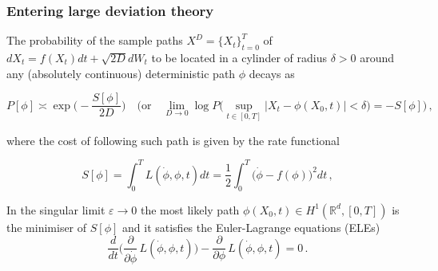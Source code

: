 \documentclass[./main.tex]{subfiles}
\begin{document}
\begin{frame}[t, label=slide06]
        \frametitle{Entering large deviation theory}

        \footnotesize
        
        \begin{theorem}\label{thm:freidlin_wentzell}
                The probability of the sample paths $X^{D}=\{X_{t}\}_{t=0}^{T}$ of $dX_{t} = f(X_{t})dt + \sqrt{2D}dW_{t}$ to be located in a cylinder of radius $\delta>0$ around any (absolutely continuous) deterministic path $\phi$ decays as

                \vspace{-0.4cm}
                \begin{equation*}
                        P[\phi]\asymp \exp\bigg(-\frac{S[\phi]}{2D}\bigg) \quad\Bigg(\text{or}\quad\lim_{D\to0}\log P\bigg(\sup_{t\in[0,T]}|X_{t}-\phi(X_{0},t)|<\delta\bigg) = -S[\phi]\Bigg)\,,
                \end{equation*}

                where the cost of following such path is given by the rate functional 

                \begin{equation*}
                        S[\phi] = \int_{0}^{T}L(\dot{\phi},\phi,t)dt = \frac{1}{2}\int_{0}^{T}\Big(\dot{\phi}-f(\phi)\Big)^{2}dt\,,
                \end{equation*}
        \end{theorem}

        \vspace{0.5cm}
        In the singular limit $\varepsilon\to0$ the most likely path $\phi(X_{0},t)\in H^{1}(\mathbb{R}^{d},[0,T])$ is the minimiser of $S[\phi]$ and it satisfies the Euler-Lagrange equations (ELEs)
        \begin{equation*}
                \frac{d}{dt}\bigg(\frac{\partial}{\partial\dot{\phi}}\,L(\dot{\phi},\phi,t)\bigg) - \frac{\partial}{\partial\phi}\,L(\dot{\phi},\phi,t) = 0\,.
        \end{equation*}
\end{frame}
\end{document}
